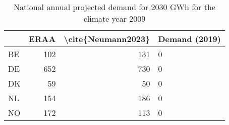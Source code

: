 \begin{table}
\centering
\caption{National annual projected demand for 2030  GWh for the climate year 2009}
\begin{tabular}{lrrl}
\toprule
{} &  ERAA &  \textbackslash cite\{Neumann2023\} & Demand (2019) \\
\midrule
BE &   102 &                 131 &             0 \\
DE &   652 &                 730 &             0 \\
DK &    59 &                  50 &             0 \\
NL &   154 &                 186 &             0 \\
NO &   172 &                 113 &             0 \\
\bottomrule
\end{tabular}
\end{table}
